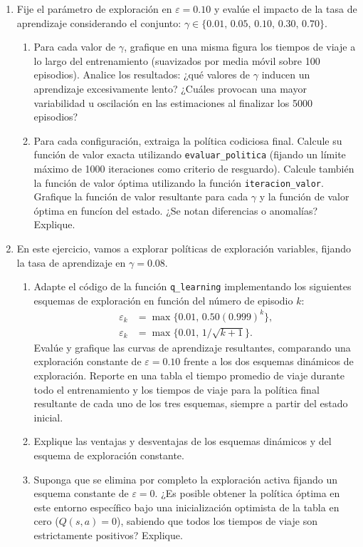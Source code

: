 \documentclass[12pt]{article}
\begin{document}
\begin{enumerate}
\item Fije el parámetro de exploración en $\varepsilon=0.10$ y evalúe el impacto de la tasa de aprendizaje considerando el conjunto: $\gamma \in \{0.01,\,0.05,\,0.10,\,0.30,\,0.70\}$.
\begin{enumerate}
  \item Para cada valor de $\gamma$, grafique en una misma figura los tiempos de viaje a lo largo del entrenamiento (suavizados por media móvil sobre 100 episodios). Analice los resultados: ¿qué valores de $\gamma$ inducen un aprendizaje excesivamente lento? ¿Cuáles provocan una mayor variabilidad u oscilación en las estimaciones al finalizar los 5000 episodios?
  \item Para cada configuración, extraiga la política codiciosa final. Calcule su función de valor exacta utilizando \texttt{evaluar\_politica} (fijando un límite máximo de 1000 iteraciones como criterio de resguardo). Calcule también la función de valor óptima utilizando la función \texttt{iteracion\_valor}. Grafique la función de valor resultante para cada $\gamma$ y la función de valor óptima en func\'ion del estado. ¿Se notan diferencias o anomalías? Explique. 
\end{enumerate}

\item En este ejercicio, vamos a explorar políticas de exploración variables, fijando la tasa de aprendizaje en $\gamma=0.08$.
\begin{enumerate}
  \item Adapte el código de la función \texttt{q\_learning} implementando los siguientes esquemas de exploración en función del número de episodio $k$: 
  \begin{align*}
    \varepsilon_k &= \max\{0.01,\,0.50(0.999)^k\},\\
    \varepsilon_k &= \max\{0.01,\,1/\sqrt{k+1}\}.
  \end{align*}
  Evalúe y grafique las curvas de aprendizaje resultantes, comparando una exploración constante de $\varepsilon=0.10$ frente a los dos esquemas dinámicos de exploración. Reporte en una tabla el tiempo promedio de viaje durante todo el entrenamiento y los tiempos de viaje para la política final resultante de cada uno de los tres esquemas, siempre a partir del estado inicial.
  \item Explique las ventajas y desventajas de los esquemas dinámicos y del esquema de exploración constante.
  \item Suponga que se elimina por completo la exploración activa fijando un esquema constante de $\varepsilon=0$. ¿Es posible obtener la política óptima en este entorno específico bajo una inicialización optimista de la tabla en cero ($Q(s,a)=0$), sabiendo que todos los tiempos de viaje son estrictamente positivos? Explique.
\end{enumerate}


\end{enumerate}
\end{document}

